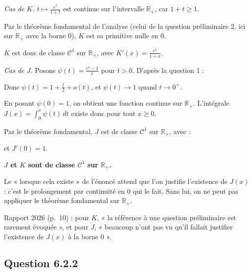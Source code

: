 \documentclass[11pt,a4paper]{article}
\newcommand{\equationajustee}[1]{%
  \sbox{\boiteequation}{$\displaystyle #1$}%
  \ifdim\wd\boiteequation>\linewidth
    \[\resizebox{\linewidth}{!}{\usebox{\boiteequation}}\]%
  \else
    \[#1\]%
  \fi}
\begin{document}
\emph{Cas de \(K\).} \(t\mapsto\frac{e^t}{1+t}\) est continue sur l'intervalle \(\mathbb R_+\), car \(1+t\ge1\).

Par le théorème fondamental de l'analyse (celui de la question préliminaire 2, ici sur \(\mathbb R_+\) avec la borne \(0\)), \(K\) est sa primitive nulle en \(0\).

\(K\) est donc de classe \(\mathcal C^1\) sur \(\mathbb R_+\), avec \(K'(x)=\frac{e^x}{1+x}\).

\emph{Cas de \(J\).} Posons \(\psi(t)=\frac{e^t-1}{t}\) pour \(t>0\). D'après la question 1 :

\equationajustee{e^t-1=t+\frac{t^2}2+\underset{t\to0}{o}(t^2).}

Donc \(\psi(t)=1+\frac t2+o(t)\), et \(\psi(t)\to1\) quand \(t\to0^+\).

En posant \(\psi(0)=1\), on obtient une fonction continue sur \(\mathbb R_+\). L'intégrale \(J(x)=\int_0^x\psi(t)\,dt\) existe donc pour tout \(x\ge0\).

Par le théorème fondamental, \(J\) est de classe \(\mathcal C^1\) sur \(\mathbb R_+\), avec :

\equationajustee{J'(x)=\frac{e^x-1}{x}\quad(x>0)}

et \(J'(0)=1\).

\textbf{\(J\) et \(K\) sont de classe \(\mathcal C^1\) sur \(\mathbb R_+\).}

\begin{piege}

Le « lorsque cela existe » de l'énoncé attend que l'on justifie l'existence de \(J(x)\) : c'est le prolongement par continuité en \(0\) qui le fait. Sans lui, on ne peut pas appliquer le théorème fondamental sur \(\mathbb R_+\).

\end{piege}

\begin{jury}

Rapport 2026 (p.~10) : pour \(K\), « la référence à une question préliminaire est rarement évoquée », et pour \(J\), « beaucoup n'ont pas vu qu'il fallait justifier l'existence de \(J(x)\) à la borne 0 ».

\end{jury}

\hypertarget{question-6.2.2}{%
\subsection{Question 6.2.2}\label{question-6.2.2}}
\end{document}

